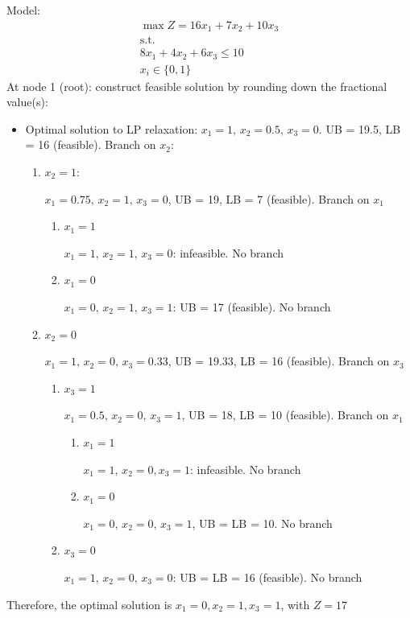 \documentclass[10pt]{article}
\begin{document}
Model:
\begin{gather*}
    \max Z = 16x_1 + 7x_2 + 10x_3\\
    \text{s.t.}\\
    8x_1 + 4x_2 + 6x_3 \le 10\\
    x_i\in \{0, 1\}
\end{gather*}
At node 1 (root): construct feasible solution by rounding down the fractional value(s): 
\begin{itemize}
    \item Optimal solution to LP relaxation: $x_1 = 1,\, x_2 = 0.5,\, x_3 = 0 $. UB = 19.5, LB = 16 (feasible). Branch on $x_2 $:
    \begin{enumerate}
        \item $x_2 = 1 $:

        $x_1 = 0.75,\, x_2 = 1,\, x_3 = 0 $, UB = 19, LB = 7 (feasible). Branch on $x_1 $
        \begin{enumerate}
            \item $x_1 = 1 $

            $x_1 = 1,\, x_2 = 1,\, x_3 = 0 $: infeasible. No branch
            \item $x_1 = 0 $

            $x_1 = 0,\, x_2 = 1,\, x_3 = 1 $: UB = 17 (feasible). No branch 
        \end{enumerate}
        \item $x_2 = 0 $

        $x_1 = 1,\, x_2 = 0,\, x_3 = 0.33 $, UB = 19.33, LB = 16 (feasible). Branch on $x_3 $
        \begin{enumerate}
            \item $x_3 = 1 $

            $x_1 = 0.5,\, x_2 = 0,\, x_3 = 1 $, UB = 18, LB = 10 (feasible). Branch on $x_1 $
            \begin{enumerate}
                \item $x_1 = 1 $

                $x_1 = 1,\, x_2 = 0, x_3 = 1 $: infeasible. No branch
                \item $x_1 = 0 $

                $x_1 = 0,\, x_2 = 0,\, x_3 = 1 $, UB = LB = 10. No branch 
            \end{enumerate}
            \item $x_3 = 0 $

            $x_1 = 1,\, x_2 = 0,\, x_3 = 0 $: UB = LB = 16 (feasible). No branch
        \end{enumerate}
    \end{enumerate}
\end{itemize}
Therefore, the optimal solution is $x_1 = 0, x_2 = 1, x_3 = 1 $, with $Z = 17 $
\newpage 
\end{document}
